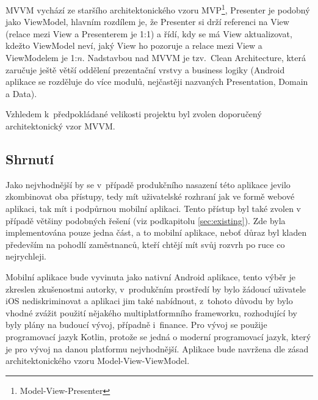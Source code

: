 \documentclass[twoside]{ctuthesis}
\begin{document}
MVVM vychází ze staršího architektonického vzoru MVP\footnote{Model-View-Presenter}, Presenter je podobný jako ViewModel, hlavním rozdílem je, že Presenter si drží referenci na View (relace mezi View a Presenterem je 1:1) a řídí, kdy se má View aktualizovat, kdežto ViewModel neví, jaký View ho pozoruje a relace mezi View a ViewModelem je 1:$n$. \cite{vogel2017android} Nadstavbou nad MVVM je tzv.~Clean Architecture, která zaručuje ještě větší oddělení prezentační vrstvy a business logiky (Android aplikace se rozděluje do více modulů, nejčastěji nazvaných Presentation, Domain a Data). \cite{jain2019kotlin}


Vzhledem k~předpokládané velikosti projektu byl zvolen doporučený architektonický vzor MVVM.

\subsection{Shrnutí}

Jako nejvhodnější by se v~případě produkčního nasazení této aplikace jevilo zkombinovat oba přístupy, tedy mít uživatelské rozhraní jak ve formě webové aplikaci, tak mít i podpůrnou mobilní aplikaci. Tento přístup byl také zvolen v případě většiny podobných řešení (viz podkapitolu \ref{sec:existing}). Zde byla implementována pouze jedna část, a to mobilní aplikace, neboť důraz byl kladen především na pohodlí zaměstnanců, kteří chtějí mít svůj rozvrh po ruce co nejrychleji. %

Mobilní aplikace bude vyvinuta jako nativní Android aplikace, tento výběr je zkreslen zkušenostmi autorky, v~produkčním prostředí by bylo žádoucí uživatele iOS nediskriminovat a aplikaci jim také nabídnout, z~tohoto důvodu by bylo vhodné zvážit použití nějakého multiplatformního frameworku, rozhodující by byly plány na budoucí vývoj, případně i~finance. Pro vývoj se použije programovací jazyk Kotlin, protože se jedná o moderní programovací jazyk, který je pro vývoj na danou platformu nejvhodnější. Aplikace bude navržena dle zásad architektonického vzoru Model-View-ViewModel.
\end{document}
